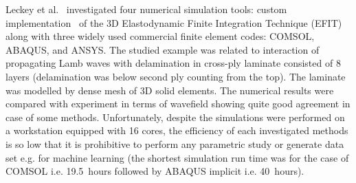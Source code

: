 \documentclass[preprint,12pt]{elsarticle}
\begin{document}
	Leckey et al.~\cite{Leckey2018} investigated four numerical simulation tools: custom implementation~\cite{Leckey2014} of the 3D Elastodynamic Finite Integration Technique (EFIT) \cite{Schubert1998} along with three widely used commercial finite element codes: COMSOL, ABAQUS, and ANSYS. The studied example was related to interaction of propagating Lamb waves with delamination in cross-ply laminate consisted of 8 layers (delamination was below second ply counting from the top). The laminate was modelled by dense mesh of 3D solid elements. The numerical results were compared with experiment in terms of wavefield showing quite good agreement in case of some methods. Unfortunately, despite the simulations were performed on a workstation equipped with 16 cores, the efficiency of each investigated methods is so low that it is prohibitive to perform any parametric study or generate data set e.g. for machine learning (the shortest simulation run time was for the case of COMSOL i.e. 19.5~hours followed by ABAQUS implicit i.e. 40~hours).
	
\end{document}
